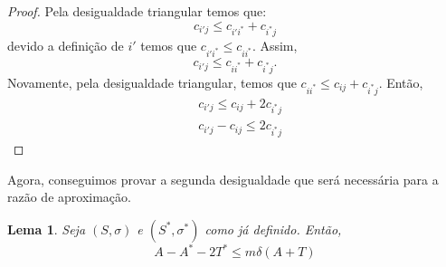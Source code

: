 \documentclass[12pt]{article}
\newtheorem{lemma}[theorem]{Lema}
\begin{document}
\begin{proof}
    Pela desigualdade triangular temos que:
    \[c_{i'j} \leq c_{i'i^*} + c_{i^*j}\]
    devido a definição de $i'$ temos que $c_{i'i^*} \leq c_{ii^*}$. Assim,
    \[c_{i'j} \leq c_{ii^*} + c_{i^*j}.\]
    Novamente, pela desigualdade triangular, temos que $c_{ii^*} \leq c_{ij} + c_{i^*j}$. Então,
    \begin{align*}
        &c_{i'j} \leq c_{ij} + 2 c_{i^*j}\\
        &c_{i'j} - c_{ij} \leq 2 c_{i^*j}
    \end{align*}
\end{proof}

Agora, conseguimos provar a segunda desigualdade que será necessária para a razão de aproximação.
\begin{lemma}
    \label{lema:3.9}
    Seja $(S,\sigma)$ e $(S^*,\sigma^*)$ como já definido. Então,
    \[A - A^* - 2T^* \leq m \delta(A+T)\]
\end{lemma}
\end{document}
